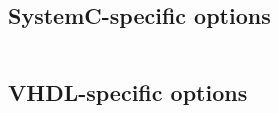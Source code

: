 \begin{tabular}[c]{ll}

\end{tabular}

\subsection*{SystemC-specific options}
\label{sec:systemc-options}

\begin{tabular}[c]{ll}

\end{tabular}

\subsection*{VHDL-specific options}
\label{sec:vhdl-options}

\begin{tabular}[c]{ll}

\end{tabular}

\normalsize


